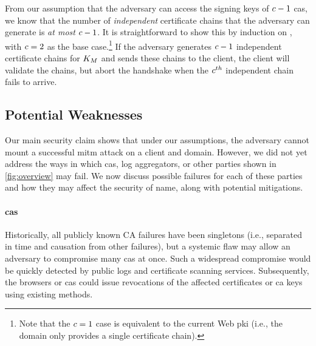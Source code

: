 
From our assumption that the adversary can access the signing keys
of $c - 1$ \acp{ca},
we know that the number of \emph{independent} certificate chains that the adversary can generate
is \emph{at most} $c - 1$. It is straightforward to show this by induction
on \policy, with $c = 2$ as the base case.\footnote{Note that the $c
= 1$ case is equivalent to the current Web \ac{pki} (i.e., the domain only
provides a single certificate chain).} If the adversary generates $c - 1$
independent certificate chains for $K_M$ and sends these chains to
the client, the client will validate the chains, but abort the handshake when
the $c^{th}$ independent chain fails to arrive. 

\subsection{Potential Weaknesses}
\label{sec:analysis:weaknesses}

Our main security claim shows that under our assumptions, the adversary cannot
mount a successful \ac{mitm} attack on a client and domain. However, we did not
yet address the ways in which \acp{ca}, log aggregators, or other parties shown
in \autoref{fig:overview} may fail. We now discuss possible failures for each
of these parties and how they may affect the security of \ac{name}, along with
potential mitigations.

\paragraph{\acp{ca}}
Historically, all publicly known CA failures have been singletons (i.e.,
separated in time and causation from other failures), but a systemic flaw may
allow an adversary to compromise many \acp{ca} at once. 
Such a widespread compromise would be quickly detected by public
logs and certificate scanning services. Subsequently, the browsers or \acp{ca}
could issue revocations of the affected certificates or \ac{ca} keys using
existing methods.

